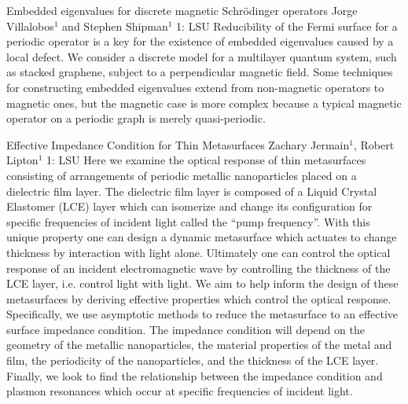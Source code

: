 \begin{addmargin}[2em]{0em}
\vspace{1.5ex}
\abs
{Embedded eigenvalues for discrete magnetic Schrödinger operators}
{Jorge Villalobos$^{1}$ and Stephen Shipman$^{1}$}
{1: LSU}
{Reducibility of the Fermi surface for a periodic operator is a key for the existence of embedded eigenvalues caused by a local defect.  We consider a discrete model for a multilayer quantum system, such as stacked graphene, subject to a perpendicular magnetic field.  Some techniques for constructing embedded eigenvalues extend from non-magnetic operators to magnetic ones, but the magnetic case is more complex because a typical magnetic operator on a periodic graph is merely quasi-periodic.}


\vspace{1.5ex}
\abs
{Effective Impedance Condition for Thin Metasurfaces}
{Zachary Jermain$^{1}$, Robert Lipton$^{1}$}
{1: LSU}
{Here we examine the optical response of thin metasurfaces consisting of arrangements of periodic metallic nanoparticles placed on a dielectric film layer. The dielectric film layer is composed of a Liquid Crystal Elastomer (LCE) layer which can isomerize and change its configuration for specific frequencies of incident light called the ``pump frequency”. With this unique property one can design a dynamic metasurface which actuates to change thickness by interaction with light alone. Ultimately one can control the optical response of an incident electromagnetic wave by controlling the thickness of the LCE layer, i.e. control light with light. We aim to help inform the design of these metasurfaces by deriving effective properties which control the optical response. Specifically, we use asymptotic methods to reduce the metasurface to an effective surface impedance condition. The impedance condition will depend on the geometry of the metallic nanoparticles, the material properties of the metal and film, the periodicity of the nanoparticles, and the thickness of the LCE layer. Finally, we look to find the relationship between the impedance condition and plasmon resonances which occur at specific frequencies of incident light.}



\end{addmargin}
